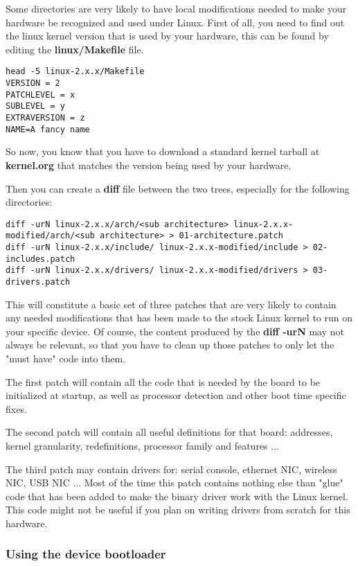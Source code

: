 Some directories are very likely to have local modifications needed to make your
hardware be recognized and used under Linux. First of all, you need to find out 
the linux kernel version that is used by your hardware, this can be found by 
editing the \textbf{linux/Makefile} file.

\begin{verbatim}
head -5 linux-2.x.x/Makefile
VERSION = 2
PATCHLEVEL = x
SUBLEVEL = y
EXTRAVERSION = z
NAME=A fancy name
\end{verbatim}

So now, you know that you have to download a standard kernel tarball at 
\textbf{kernel.org} that matches the version being used by your hardware.

Then you can create a \textbf{diff} file between the two trees, especially for the 
following directories:

\begin{verbatim}
diff -urN linux-2.x.x/arch/<sub architecture> linux-2.x.x-modified/arch/<sub architecture> > 01-architecture.patch
diff -urN linux-2.x.x/include/ linux-2.x.x-modified/include > 02-includes.patch
diff -urN linux-2.x.x/drivers/ linux-2.x.x-modified/drivers > 03-drivers.patch
\end{verbatim}

This will constitute a basic set of three patches that are very likely to contain
any needed modifications that has been made to the stock Linux kernel to run on 
your specific device. Of course, the content produced by the \textbf{diff -urN} 
may not always be relevant, so that you have to clean up those patches to only 
let the "must have" code into them.

The first patch will contain all the code that is needed by the board to be 
initialized at startup, as well as processor detection and other boot time 
specific fixes.

The second patch will contain all useful definitions for that board: addresses, 
kernel granularity, redefinitions, processor family and features ...

The third patch may contain drivers for: serial console, ethernet NIC, wireless 
NIC, USB NIC ... Most of the time this patch contains nothing else than "glue"
code that has been added to make the binary driver work with the Linux kernel. 
This code might not be useful if you plan on writing drivers from scratch for 
this hardware.

\subsubsection{Using the device bootloader}

